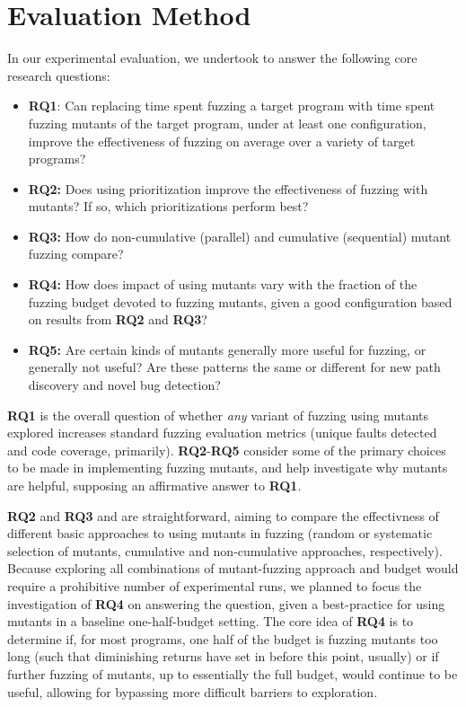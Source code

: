 \section{Evaluation Method}

In our experimental evaluation, we undertook to answer the following core research questions:

\begin{itemize}
  \item {\bf RQ1}: Can replacing time spent fuzzing a target program with time spent fuzzing mutants of the target program, under at least one configuration, improve
  the effectiveness of fuzzing on average over a variety of target programs?
  \item {\bf RQ2:} Does using prioritization improve the effectiveness of fuzzing with mutants?  If so, which prioritizations perform best?
  \item {\bf RQ3:} How do non-cumulative (parallel) and cumulative (sequential) mutant fuzzing compare?
  \item {\bf RQ4:} How does impact of using mutants vary with the fraction of the fuzzing budget devoted to fuzzing mutants, given a good configuration based on results from {\bf RQ2} and {\bf RQ3}?
  \item {\bf RQ5:} Are certain kinds of mutants generally more useful for fuzzing, or generally not useful?  Are these patterns the same or different for new path discovery and novel bug detection?
  \end{itemize}
  
{\bf RQ1} is the overall question of whether \emph{any} variant of fuzzing using mutants explored increases standard fuzzing evaluation metrics
(unique faults detected and code coverage, primarily).  {\bf RQ2}-{\bf RQ5} consider some of the primary choices to be made in implementing fuzzing mutants, and help investigate why mutants are helpful, supposing an affirmative answer to {\bf RQ1}.

{\bf RQ2} and {\bf RQ3} and are straightforward, aiming to compare the effectivness of different basic approaches to using mutants in fuzzing (random or systematic selection of mutants, cumulative and non-cumulative approaches, respectively).  Because exploring all combinations of mutant-fuzzing approach and budget would require a prohibitive number of experimental runs, we planned to focus the investigation of {\bf RQ4} on answering the question, given a best-practice for using mutants in a baseline one-half-budget setting.  The core idea of {\bf RQ4} is to determine if, for most programs, one half of the budget is fuzzing mutants too long (such that diminishing returns have set in before this point, usually) or if further fuzzing of mutants, up to essentially the full budget, would continue to be useful, allowing for bypassing more difficult barriers to exploration.

